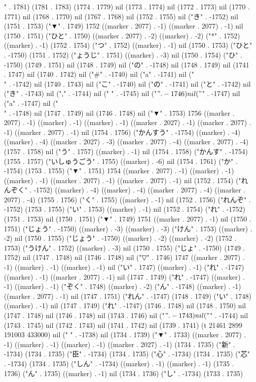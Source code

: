" . 1781) (1781 . 1783) (1774 . 1779) nil (1773 . 1774) nil (1772 . 1773) nil (1770 . 1771) nil (1768 . 1770) nil (1767 . 1768) nil (1752 . 1755) nil ("き" . -1752) nil (1751 . 1753) ("▼" . 1749) 1752 ((marker . 2077) . -1) ((marker . 2077) . -1) nil (1750 . 1751) ("ひと" . 1750) ((marker . 2077) . -2) ((marker) . -2) ("*" . 1752) ((marker) . -1) (1752 . 1754) ("つ" . 1752) ((marker) . -1) nil (1750 . 1753) ("ひと" . -1750) (1751 . 1752) ("ょうじ" . 1751) ((marker) . -3) nil (1750 . 1754) ("ひ" . -1750) (1749 . 1751) nil (1748 . 1749) nil ("の" . -1748) nil (1748 . 1749) nil (1741 . 1747) nil (1740 . 1742) nil ("#" . -1740) nil ("a" . -1741) nil ("\\" . -1742) nil (1740 . 1743) nil ("こ" . -1740) nil ("の" . -1741) nil ("と" . -1742) nil ("き" . -1743) nil ("," . -1744) nil (" " . -1745) nil ("$" . -1746) nil ("$" . -1747) nil ("a" . -1747) nil ("\\" . -1748) nil (1747 . 1749) nil (1746 . 1748) nil ("▼" . 1753) 1756 ((marker . 2077) . -1) ((marker) . -1) ((marker) . -1) ((marker . 2027) . -1) ((marker . 2077) . -1) ((marker . 2077) . -1) nil (1754 . 1756) ("かんすう" . -1754) ((marker) . -4) ((marker) . -4) ((marker . 2027) . -3) ((marker . 2077) . -4) ((marker . 2077) . -4) (1757 . 1758) nil ("う" . 1757) ((marker) . -1) nil (1754 . 1758) ("かんす" . -1754) (1755 . 1757) ("いしゅうごう" . 1755) ((marker) . -6) nil (1754 . 1761) ("か" . -1754) (1753 . 1755) ("▼" . 1751) 1754 ((marker . 2077) . -1) ((marker) . -1) ((marker) . -1) ((marker . 2077) . -1) ((marker . 2077) . -1) nil (1752 . 1754) ("れんぞく" . -1752) ((marker) . -4) ((marker) . -4) ((marker . 2077) . -4) ((marker . 2077) . -4) (1755 . 1756) ("く" . 1755) ((marker) . -1) nil (1752 . 1756) ("れんぞ" . -1752) (1753 . 1755) ("い" . 1753) ((marker) . -1) nil (1752 . 1754) ("れ" . -1752) (1751 . 1753) nil (1750 . 1751) ("▼" . 1749) 1751 ((marker . 2077) . -1) nil (1750 . 1751) ("じょう" . -1750) ((marker) . -3) ((marker) . -3) ("けん" . 1753) ((marker) . -2) nil (1750 . 1755) ("じょう" . -1750) ((marker) . -2) ((marker) . -2) (1752 . 1753) ("うけん" . 1752) ((marker) . -3) nil (1750 . 1755) ("じょ" . -1750) (1749 . 1752) nil (1747 . 1748) nil (1746 . 1748) nil ("▽" . 1746) 1747 ((marker . 2077) . -1) ((marker) . -1) ((marker) . -1) nil ("い" . 1747) ((marker) . -1) ("れ" . -1747) ((marker) . -1) ((marker . 2077) . -1) nil (1747 . 1749) ("れ" . -1747) ((marker) . -1) ((marker) . -1) ("ぞく" . 1748) ((marker) . -2) ("ん" . -1748) ((marker) . -1) ((marker . 2077) . -1) nil (1747 . 1751) ("れん" . -1747) (1748 . 1749) ("い" . 1748) ((marker) . -1) nil (1747 . 1749) ("れ" . -1747) (1746 . 1748) nil (1748 . 1750) nil (1747 . 1748) nil (1746 . 1748) nil (1743 . 1746) nil ("$" . -1743) nil ("$" . -1744) nil (1743 . 1745) nil (1742 . 1743) nil (1741 . 1742) nil (1739 . 1741) (t 21461 2899 191003 433000) nil (" " . -1738) nil (1734 . 1739) ("▼" . 1733) ((marker . 2077) . -1) ((marker) . -1) ((marker) . -1) ((marker . 2027) . -1) (1734 . 1735) ("新" . -1734) (1734 . 1735) ("臣" . -1734) (1734 . 1735) ("心" . -1734) (1734 . 1735) ("芯" . -1734) (1734 . 1735) ("しん" . -1734) ((marker) . -1) ((marker) . -1) (1735 . 1736) ("ん" . 1735) ((marker) . -1) nil (1734 . 1736) ("し" . -1734) (1733 . 1735) 